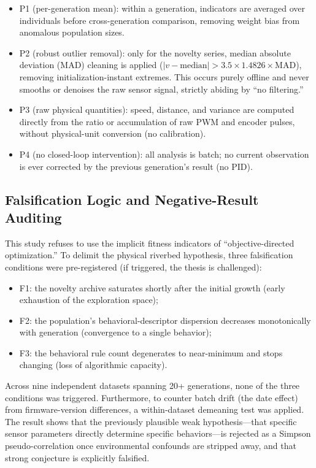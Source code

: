 \documentclass[11pt]{article}
\begin{document}
\begin{itemize}
  \item P1 (per-generation mean): within a generation, indicators are averaged over individuals before cross-generation comparison, removing weight bias from anomalous population sizes.
  \item P2 (robust outlier removal): only for the novelty series, median absolute deviation (MAD) cleaning is applied ($|v - \text{median}| > 3.5 \times 1.4826 \times \text{MAD}$), removing initialization-instant extremes. This occurs purely offline and never smooths or denoises the raw sensor signal, strictly abiding by ``no filtering.''
  \item P3 (raw physical quantities): speed, distance, and variance are computed directly from the ratio or accumulation of raw PWM and encoder pulses, without physical-unit conversion (no calibration).
  \item P4 (no closed-loop intervention): all analysis is batch; no current observation is ever corrected by the previous generation's result (no PID).
\end{itemize}

\subsection{Falsification Logic and Negative-Result Auditing}
This study refuses to use the implicit fitness indicators of ``objective-directed optimization.'' To delimit the physical riverbed hypothesis, three falsification conditions were pre-registered (if triggered, the thesis is challenged):

\begin{itemize}
  \item F1: the novelty archive saturates shortly after the initial growth (early exhaustion of the exploration space);
  \item F2: the population's behavioral-descriptor dispersion decreases monotonically with generation (convergence to a single behavior);
  \item F3: the behavioral rule count degenerates to near-minimum and stops changing (loss of algorithmic capacity).
\end{itemize}

Across nine independent datasets spanning 20+ generations, none of the three conditions was triggered. Furthermore, to counter batch drift (the date effect) from firmware-version differences, a within-dataset demeaning test was applied. The result shows that the previously plausible weak hypothesis---that specific sensor parameters directly determine specific behaviors---is rejected as a Simpson pseudo-correlation once environmental confounds are stripped away, and that strong conjecture is explicitly falsified.
\end{document}
